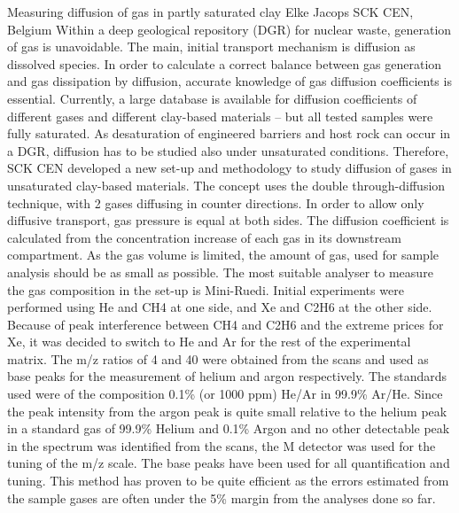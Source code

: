 \begin{conf-abstract}
{Measuring diffusion of gas in partly saturated clay}
{Elke Jacops}
{SCK CEN, Belgium}
{Within a deep geological repository (DGR) for nuclear waste, generation of gas is unavoidable. The main, initial transport mechanism is diffusion as dissolved species. In order to calculate a correct balance between gas generation and gas dissipation by diffusion, accurate knowledge of gas diffusion coefficients is essential. Currently, a large database is available for diffusion coefficients of different gases and different clay-based materials – but all tested samples were fully saturated. As desaturation of engineered barriers and host rock can occur in a DGR, diffusion has to be studied also under unsaturated conditions. Therefore, SCK CEN developed a new set-up and methodology to study diffusion of gases in unsaturated clay-based materials. The concept uses the double through-diffusion technique, with 2 gases diffusing in counter directions. In order to allow only diffusive transport, gas pressure is equal at both sides. The diffusion coefficient is calculated from the concentration increase of each gas in its downstream compartment. As the gas volume is limited, the amount of gas, used for sample analysis should be as small as possible. The most suitable analyser to measure the gas composition in the set-up is Mini-Ruedi. Initial experiments were performed using He and CH4 at one side, and Xe and C2H6 at the other side. Because of peak interference between CH4 and C2H6 and the extreme prices for Xe, it was decided to switch to He and Ar for the rest of the experimental matrix. The m/z ratios of 4 and 40 were obtained from the scans and used as base peaks for the measurement of helium and argon respectively. The standards used were of the composition 0.1\% (or 1000 ppm) He/Ar in 99.9\% Ar/He. Since the peak intensity from the argon peak is quite small relative to the helium peak in a standard gas of 99.9\% Helium and 0.1\% Argon and no other detectable peak in the spectrum was identified from the scans, the M detector was used for the tuning of the m/z scale. The base peaks have been used for all quantification and tuning. This method has proven to be quite efficient as the errors estimated from the sample gases are often under the 5\% margin from the analyses done so far.}
\end{conf-abstract}
